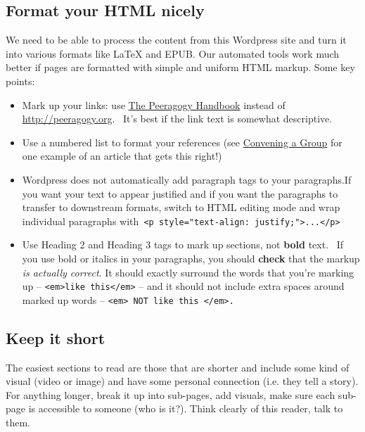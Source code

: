 \subsection{Format your HTML nicely}

We need to be able to process the content from this Wordpress site and
turn it into various formats like LaTeX and EPUB. Our automated tools
work much better if pages are formatted with simple and uniform HTML
markup. Some key points:

\begin{itemize}
\item
  Mark up your links: use \href{http://peeragogy.org}{The Peeragogy
  Handbook} instead of
  \href{http://peeragogy.org}{http://peeragogy.org}.~ It's best if the
  link text is somewhat descriptive.
\item
  Use a numbered list to format your references (see
  \href{http://peeragogy.org/convening-a-group/}{Convening a Group} for
  one example of an article that gets this right!)
\item
  Wordpress does not automatically add paragraph tags to your
  paragraphs.If you want your text to appear justified and if you want
  the paragraphs to transfer to downstream formats, switch to HTML
  editing mode and wrap individual paragraphs
  with\texttt{ \textless{}p style="text-align: justify;"\textgreater{}...\textless{}/p\textgreater{}}
\item
  Use Heading 2 and Heading 3 tags to mark up sections, not
  \textbf{bold} text.~ If you use bold or italics in your paragraphs,
  you should \textbf{check} that the markup \emph{is actually correct}.
  It should exactly surround the words that you're marking up --
  \texttt{\textless{}em\textgreater{}like this\textless{}/em\textgreater{}}
  -- and it should not include extra spaces around marked up words --
  \texttt{\textless{}em\textgreater{} NOT like this \textless{}/em\textgreater{}.}
\end{itemize}

\subsection{Keep it short}

The easiest sections to read are those that are shorter and include some
kind of visual (video or image) and have some personal connection (i.e.
they tell a story). For anything longer, break it up into sub-pages, add
visuals, make sure each sub-page is accessible to someone (who is it?).
Think clearly of this reader, talk to them.

